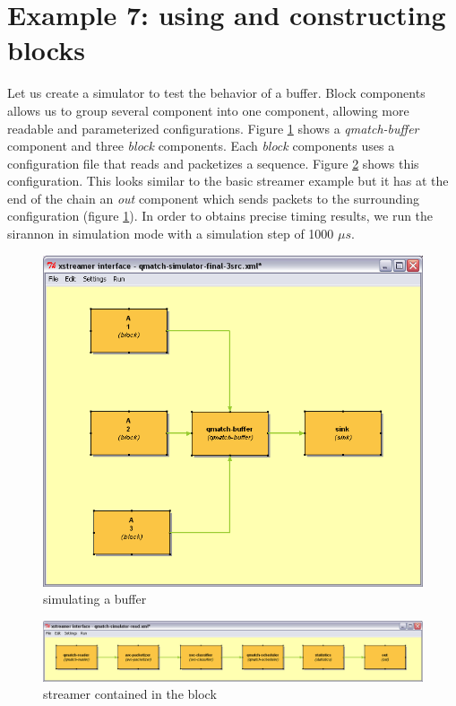 \documentclass[12pt]{report}
\begin{document}
\section{Example 7: using and constructing blocks}
Let us create a simulator to test the behavior of a buffer. Block components allows us to group several component into one component, allowing more readable and parameterized configurations. Figure \ref{fig:ex:7a} shows a \textit{qmatch-buffer} component and three \textit{block} components. Each \textit{block} components uses a configuration file that reads and packetizes a sequence. Figure \ref{fig:ex:7b} shows this configuration. This looks similar to the basic streamer example but it has at the end of the chain an \textit{out} component which sends packets to the surrounding configuration (figure \ref{fig:ex:7a}). In order to obtains precise timing results, we run the sirannon in simulation mode with a simulation step of 1000 $\mu s$.
\begin{center}
\begin{figure}[!ht]
	\includegraphics[width=1.0\textwidth]{./images/ex07a.png}
	\caption{simulating a buffer}
	\label{fig:ex:7a}
\end{figure}
\newpage
\begin{figure}[!ht]
	\includegraphics[width=1.0\textwidth]{./images/ex07b.png}
	\caption{streamer contained in the block}
	\label{fig:ex:7b}
\end{figure}
\end{center}
\newpage
\end{document}
